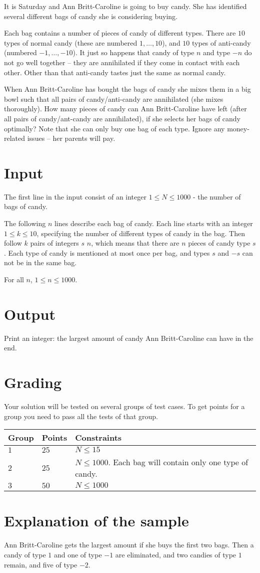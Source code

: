 It is Saturday and Ann Britt-Caroline is going to buy candy. She has identified several different bags of candy she is considering buying.

Each bag contains a number of pieces of candy of different types. There are $10$ types of normal candy (these are numbered $1, \ldots, 10$), and $10$ types of anti-candy (numbered $-1, \ldots, -10$). It just so happens that candy of type $n$ and type $-n$ do not go well together -- they are annihilated if they come in contact with each other. Other than that anti-candy tastes just the same as normal candy.

When Ann Britt-Caroline has bought the bags of candy she mixes them in a big bowl such that all pairs of candy/anti-candy are annihilated (she mixes thoroughly). How many pieces of candy can Ann Britt-Caroline have left (after all pairs of candy/ant-candy are annihilated), if she selects her bags of candy optimally? Note that she can only buy one bag of each type. Ignore any money-related issues -- her parents will pay.
\section*{Input}
The first line in the input consist of an integer $1 \le N \le 1000$ - the number of bags of candy.

The following $n$ lines describe each bag of candy.
Each line starts with an integer $1 \le k \le 10$, specifying the number of different types of candy in the bag.
Then follow $k$ pairs of integers $s$ $n$, which means that there are $n$ pieces of candy type $s$.
Each type of candy is mentioned at most once per bag, and types $s$ and $-s$ can not be in the same bag.

For all $n$, $1 \le n \le 1000$.

\section*{Output}
Print an integer: the largest amount of candy Ann Britt-Caroline can have in the end.

\section*{Grading}
Your solution will be tested on several groups of test cases. To get points for a group you need to pass all the tests of that group.

\noindent
\begin{tabular}{| l | l | l |}
	\hline
	Group & Points & Constraints\\ \hline
 $1$    & $25$        & $N \le 15$ \\ \hline
 $2$    & $25$        & $N \le 1000$. Each bag will contain only one type of candy. \\ \hline
 $3$    & $50$        & $N \le 1000$ \\ \hline
\end{tabular}

\section*{Explanation of the sample}
Ann Britt-Caroline gets the largest amount if she buys the first two bags. Then a candy of type $1$ and one of type $-1$ are eliminated, and two candies of type $1$ remain, and five of type $-2$.
